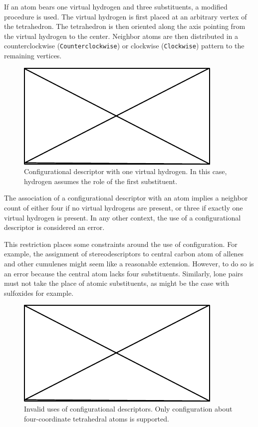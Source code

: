 \documentclass{article}
\def\ttt{\texttt}
\begin{document}
If an atom bears one virtual hydrogen and three substituents, a modified procedure is used. The virtual hydrogen is first placed at an arbitrary vertex of the tetrahedron. The tetrahedron is then oriented along the axis pointing from the virtual hydrogen to the center. Neighbor atoms are then distributed in a counterclockwise (\ttt{Counterclockwise}) or clockwise (\ttt{Clockwise}) pattern to the remaining vertices.

\begin{figure}
    \centering
    \includegraphics{filler}
    \caption{Configurational descriptor with one virtual hydrogen. In this case, hydrogen assumes the role of the first substituent.}
    \label{fig:configurational-descriptor-vh}
\end{figure}

The association of a configurational descriptor with an atom implies a neighbor count of either four if no virtual hydrogens are present, or three if exactly one virtual hydrogen is present. In any other context, the use of a configurational descriptor is considered an error.

This restriction places some constraints around the use of configuration. For example, the assignment of stereodescriptors to central carbon atom of allenes and other cumulenes might seem like a reasonable extension. However, to do so is an error because the central atom lacks four substituents. Similarly, lone pairs must not take the place of atomic substituents, as might be the case with sulfoxides for example.

\begin{figure}
    \centering
    \includegraphics{filler}
    \caption{Invalid uses of configurational descriptors. Only configuration about four-coordinate tetrahedral atoms is supported.}
    \label{fig:invalid-configurational-descriptors}
\end{figure}
\end{document}
